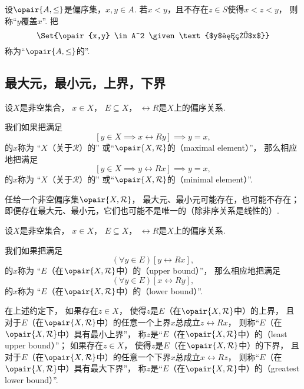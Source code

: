 \begin{definition}
设\(\opair{A,\leq}\)是偏序集，\(x,y \in A\).
若\(x < y\)，且不存在\(z \in S\)使得\(x < z < y\)，
则称“\(y\)覆盖\(x\)”.
把\[
	\Set{\opair{x,y} \in A^2 \given \text{$y$覆盖$x$}}
\]称为“\(\opair{A,\leq}\)的”.
\end{definition}

\subsection{最大元，最小元，上界，下界}
\begin{definition}
设\(X\)是非空集合，
\(x \in X\)，
\(E \subseteq X\)，
\(\rel{R}\)是\(X\)上的偏序关系.

我们如果把满足\[
	[y \in X \implies x\rel{R}y]
	\implies
	y = x,
\]的\(x\)称为
“\(X\)（关于\(\mathcal{R}\)）的”
或“\(\opair{X,\mathcal{R}}\)的（maximal element）”，
那么相应地把满足\[
	[y \in X \implies y\rel{R}x]
	\implies
	y = x,
\]的\(x\)称为
“\(X\)（关于\(\mathcal{R}\)）的”
或“\(\opair{X,\mathcal{R}}\)的（minimal element）”.
\end{definition}

任给一个非空偏序集\(\opair{X,\rel{R}}\)，
最大元、最小元可能存在，也可能不存在；
即便存在最大元、最小元，它们也可能不是唯一的（除非序关系是线性的）.

\begin{definition}
设\(X\)是非空集合，
\(x \in X\)，
\(E \subseteq X\)，
\(\rel{R}\)是\(X\)上的偏序关系.

我们如果把满足\[
	(\forall y \in E)[y\rel{R}x],
\]的\(x\)称为
“\(E\)（在\(\opair{X,\mathcal{R}}\)中）的（upper bound）”，
那么相应地把满足\[
	(\forall y \in E)[x\rel{R}y],
\]的\(x\)称为
“\(E\)（在\(\opair{X,\mathcal{R}}\)中）的（lower bound）”.

在上述约定下，
如果存在\(z \in X\)，
使得\(z\)是\(E\)（在\(\opair{X,\mathcal{R}}\)中）的上界，
且对于\(E\)（在\(\opair{X,\mathcal{R}}\)中）的任意一个上界\(x\)总成立\(z\rel{R}x\)，
则称“\(E\)（在\(\opair{X,\mathcal{R}}\)中）具有最小上界”，
称\(z\)是“\(E\)（在\(\opair{X,\mathcal{R}}\)中）的（least upper bound）”；
如果存在\(z \in X\)，
使得\(z\)是\(E\)（在\(\opair{X,\mathcal{R}}\)中）的下界，
且对于\(E\)（在\(\opair{X,\mathcal{R}}\)中）的任意一个下界\(x\)总成立\(x\rel{R}z\)，
则称“\(E\)（在\(\opair{X,\mathcal{R}}\)中）具有最大下界”，
称\(z\)是“\(E\)（在\(\opair{X,\mathcal{R}}\)中）的（greatest lower bound）”.
\end{definition}


